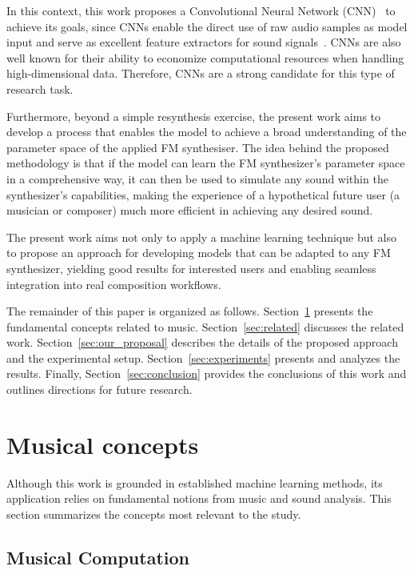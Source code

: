 \documentclass[10pt,conference]{IEEEtran}
\begin{document}
In this context, this work proposes a Convolutional Neural Network (CNN)~\cite{LeCun1989,alexnet} to achieve its goals, since CNNs enable the direct use of raw audio samples as model input and serve as excellent feature extractors for sound signals~\cite{kiranyaz2021survey}. CNNs are also well known for their ability to economize computational resources when handling high-dimensional data. Therefore, CNNs are a strong candidate for this type of research task.

Furthermore, beyond a simple resynthesis exercise, the present work aims to develop a process that enables the model to achieve a broad understanding of the parameter space of the applied FM synthesiser. The idea behind the proposed methodology is that if the model can learn the FM synthesizer’s parameter space in a comprehensive way, it can then be used to simulate any sound within the synthesizer’s capabilities, making the experience of a hypothetical future user (a musician or composer) much more efficient in achieving any desired sound.

The present work aims not only to apply a machine learning technique but also to propose an approach for developing models that can be adapted to any FM synthesizer, yielding good results for interested users and enabling seamless integration into real composition workflows.

The remainder of this paper is organized as follows. Section~\ref{sec:fund} presents the fundamental concepts related to music. Section~\ref{sec:related} discusses the related work. Section~\ref{sec:our_proposal} describes the details of the proposed approach and the experimental setup. Section~\ref{sec:experiments} presents and analyzes the results. Finally, Section~\ref{sec:conclusion} provides the conclusions of this work and outlines directions for future research.

\section{Musical concepts} \label{sec:fund} 

Although this work is grounded in established machine learning methods, its application relies on fundamental notions from music and sound analysis. This section summarizes the concepts most relevant to the study.

\subsection{Musical Computation}
\end{document}
